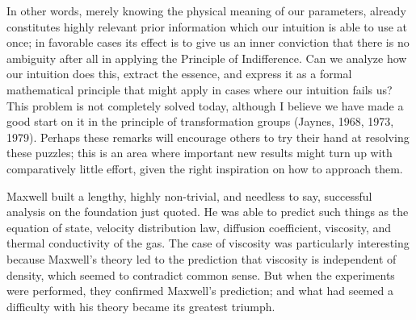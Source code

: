In other words, merely knowing the physical meaning of our parameters, already constitutes highly relevant prior information which our intuition is able to use at once; in favorable cases its effect is to give us an inner conviction that there is no ambiguity after all in applying the Principle of Indifference.
Can we analyze how our intuition does this, extract the essence, and express it as a formal mathematical principle that might apply in cases where our intuition fails us?
This problem is not completely solved today, although I believe we have made a good start on it in the principle of transformation groups (Jaynes, \cite{jaynes68}{1968}, \cite{jaynes73}{1973}, \cite{jaynes79}{1979}).
Perhaps these remarks will encourage others to try their hand at resolving these puzzles; this is an area where important new results might turn up with comparatively little effort, given the right inspiration on how to approach them.

Maxwell built a lengthy, highly non-trivial, and needless to say, successful analysis on the foundation just quoted.
He was able to predict such things as the equation of state, velocity distribution law, diffusion coefficient, viscosity, and thermal conductivity of the gas.
The case of viscosity was particularly interesting because Maxwell's theory led to the prediction that viscosity is independent of density, which seemed to contradict common sense.
But when the experiments were performed, they confirmed Maxwell's prediction; and what had seemed a difficulty with his theory became its greatest triumph.

